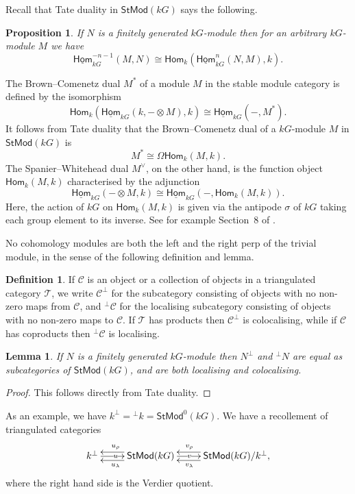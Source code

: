 \documentclass[12pt]{amsart}
\newcommand{\Hom}{\mathsf{Hom}}
\newcommand{\kG}{\kk G}
\newcommand{\kk}{k}
\newcommand{\sHom}{\underline{\Hom}}
\newcommand{\StMod}{\mathsf{StMod}}
\newcommand{\cC}{\mathcal C}
\newcommand{\cT}{\mathcal{T}}
\numberwithin{equation}{section}
\theoremstyle{plain}
\newtheorem{lemma}[equation]{Lemma}
\newtheorem{proposition}[equation]{Proposition}
\theoremstyle{definition}
\newtheorem{definition}[equation]{Definition}
\theoremstyle{remark}
\begin{document}
Recall that Tate duality in $\StMod(\kG)$ says the following.


\begin{proposition}\label{pr:Tate-StMod}
 If $N$ is a finitely
generated $\kG$-module then for an arbitrary $\kG$-module $M$ we have
\[ \sHom^{-n-1}_{\kG}(M,N) \cong \Hom_\kk(\sHom^n_{\kG}(N,M),\kk). \]
\end{proposition}

The Brown--Comenetz dual $M^*$ of a 
module $M$ in the stable module category 
is defined by the isomorphism
\[ \Hom_\kk(\sHom_{\kG}(\kk,-\otimes M),\kk) \cong
  \sHom_{\kG}(-,M^*). \]
It follows from Tate duality that the Brown--Comenetz dual of a 
$\kG$-module $M$ in $\StMod(\kG)$ is 
\[ M^*\cong \Omega \Hom_k(M,k). \]
The Spanier--Whitehead dual $M^\vee$, on the other hand, is the function object
$\Hom_\kk(M,\kk)$ characterised by the adjunction
\[ \sHom_{\kG}(- \otimes M,\kk) \cong \sHom_{\kG}(-,\Hom_\kk(M,\kk)). \]
Here, the action of $\kG$ on $\Hom_k(M,k)$ is given via the 
antipode $\sigma$ of $\kG$ taking each group element to its inverse. 
See for example Section~8 of \cite{Benson/Iyengar/Krause:2011b}.\medskip



No cohomology modules are both the left and the right perp of the trivial module, in the
sense of the following definition and lemma.

\begin{definition}
If $\cC$ is an object or a collection of objects in a triangulated category $\cT$, we
write $\cC^\perp$ for the subcategory consisting of objects
with no non-zero maps from $\cC$, and ${}^\perp\cC$ for the localising
subcategory consisting of objects with no non-zero maps to $\cC$.
If $\cT$ has products then $\cC^\perp$ is colocalising, while if $\cC$
has coproducts then ${}^\perp\cC$ is localising.
\end{definition}

\begin{lemma}
If $N$ is a finitely generated $\kG$-module then $N^\perp$ and
${}^\perp N$ are equal as subcategories of $\StMod(\kG)$, and are both
localising and colocalising.
\end{lemma}
\begin{proof}
This follows directly from Tate duality.
\end{proof}

As an example, we have $\kk^\perp={}^\perp\kk=\StMod^0(\kG)$.
We have a recollement of triangulated categories
\[ \xymatrix{\kk^\perp \ar[r]|(0.4)u & \StMod(\kG) 
\ar[r]|(0.45)v\ar@<1ex>[l]^(0.6){u_\lambda}\ar@<-1ex>[l]_(0.6){u_\rho} & 
\StMod(\kG)/\kk^\perp \ar@<1ex>[l]^(0.55){v_\lambda}
\ar@<-1ex>[l]_(0.55){v_\rho},} \]
where the right hand side is the Verdier quotient.
\end{document}
